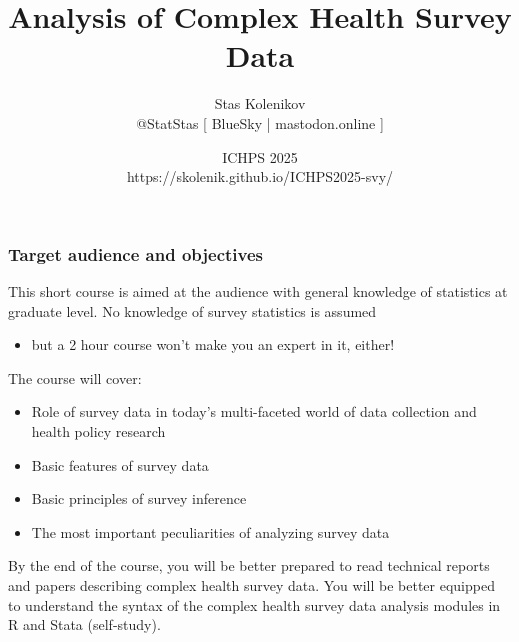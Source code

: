 \documentclass[aspectratio=43]{beamer}
\begin{document}
\title{\textbf{Analysis of Complex Health Survey Data}}
\author[Stas Kolenikov]{Stas Kolenikov \\ @StatStas [ BlueSky | mastodon.online ]}
\date[ICHPS 2025]{ICHPS 2025
 \medskip \\ https://skolenik.github.io/ICHPS2025-svy/ }




\begin{frame}
    \titlepage
\end{frame}

\begin{frame}\frametitle{Target audience and objectives}

This short course is aimed at the audience with general knowledge of statistics
at graduate level. No knowledge of survey statistics is assumed
\begin{itemize}
    \item but a 2 hour course won't make you an expert in it, either!
\end{itemize}

The course will cover:
\begin{itemize}
    \item Role of survey data in today's multi-faceted world of data collection
          and health policy research
    \item Basic features of survey data
    \item Basic principles of survey inference
    \item The most important peculiarities of analyzing survey data
\end{itemize}

By the end of the course, you will be better prepared to read technical reports
and papers describing complex health survey data. You will be better equipped to
understand the syntax of the complex health survey data analysis modules
in R and Stata (self-study).

\end{frame}
\end{document}
